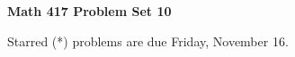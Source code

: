 \documentclass[12pt]{article}
\begin{document}
\def\ctln{\centerline}
\def\msk{\medskip}
\def\bsk{\bigskip}
\def\ssk{\smallskip}
\def\hsk{\hskip.3in}
\def\ra{\rightarrow}
\def\ubr{\underbar}

\def\mt{{\mathcal T}}
\def\mb{{\mathcal B}}
\def\ms{{\mathcal S}}
\def\mu{{\mathcal U}}
\def\mv{{\mathcal V}}

\def\bbr{{\mathbb R}}
\def\bbz{{\mathbb Z}}
\def\bbq{{\mathbb Q}}
\def\spc{$~$\hskip.15in$~$}

\def\sset{\subseteq}
\def\del{\partial}
\def\lra{$\Leftrightarrow$}
\def\bra{$\Rightarrow$}




\ctln{\bf Math 417 Problem Set 10}

\msk

Starred (*) problems are due Friday, November 16.
\end{document}
